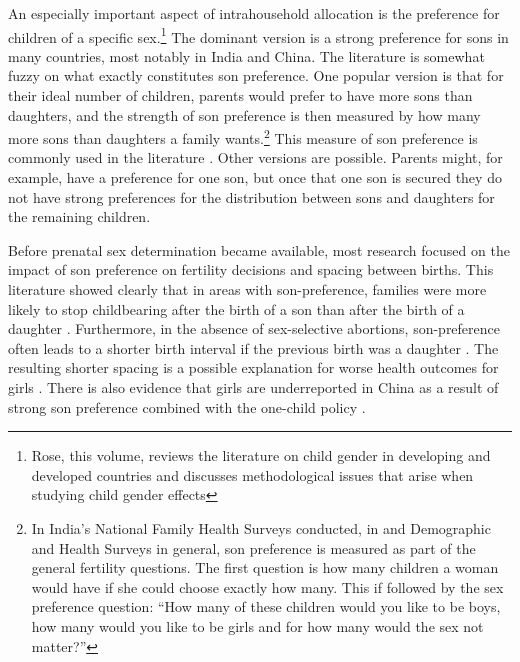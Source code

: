 An especially important aspect of intrahousehold allocation is the preference for children of a specific sex.\footnote{Rose, this volume, reviews the literature on child gender in developing and developed countries and discusses methodological issues that arise when studying child gender effects} The dominant version is a strong preference for sons in many countries, most notably in India and China. The literature is somewhat fuzzy on what exactly constitutes son preference. One popular version is that for their ideal number of children, parents would prefer to have more sons than daughters, and the strength of son preference is then measured by how many more sons than daughters a family wants.\footnote{In India's National Family Health Surveys conducted, in and Demographic and Health Surveys in general, son preference is measured as part of the general fertility questions. The first question is how many children a woman would have if she could choose exactly how many. This if followed by the sex preference question: ``How many of these children would you like to be boys, how many would you like to be girls and for how many would the sex not matter?''} This measure of son preference is commonly used in the literature \citep[e.g.]{clark00,Jensen2009,Hu2015}. Other versions are possible. Parents might, for example, have a preference for one son, but once that one son is secured they do not have strong preferences for the distribution between sons and daughters for the remaining children.

Before prenatal sex determination became available, most research focused on the impact of son preference on fertility decisions and spacing between births. This literature showed clearly that in areas with son-preference, families were more likely to stop childbearing after the birth of a son than after the birth of a daughter \citep[see, for
example,][]{Das1987,Arnold1997,clark00,filmer09}. Furthermore, in the absence of sex-selective abortions, son-preference often leads to a shorter birth interval if the previous birth was a daughter \citep[see, for
example,][]{Das1987,Rahman1993,Pong1994,Haughton1996,Arnold1997}. The resulting shorter spacing is a possible explanation for worse health outcomes for girls \citep{arnold98,Whitworth2002,Rutstein2005,Conde-Agudelo2006}. There is also evidence that girls are underreported in China as a result of strong son preference combined with the one-child policy \citep{Merli2000}.

